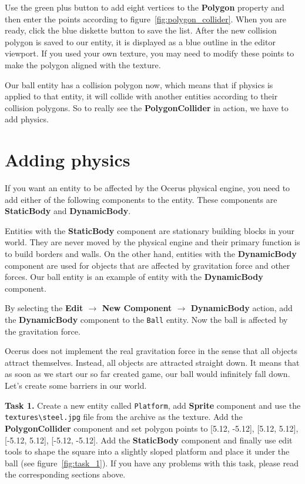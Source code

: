 \documentclass[a4paper,12pt]{article}
\begin{document}
Use the green plus button to add eight vertices to the \textbf{Polygon} property and then enter the points according to figure~\ref{fig:polygon_collider}. When you are ready, click the blue diskette button to save the list. After the new collision polygon is saved to our entity, it is displayed as a blue outline in the editor viewport. If you used your own texture, you may need to modify these points to make the polygon aligned with the texture.

Our ball entity has a collision polygon now, which means that if physics is applied to that entity, it will collide with another entities according to their collision polygons. So to really see the \textbf{PolygonCollider} in action, we have to add physics.

\section{Adding physics}
If you want an entity to be affected by the Ocerus physical engine, you need to add either of the following components to the entity. These components are \textbf{StaticBody} and \textbf{DynamicBody}.

Entities with the \textbf{StaticBody} component are stationary building blocks in your world. They are never moved by the physical engine and their primary function is to build borders and walls. On the other hand, entities with the \textbf{DynamicBody} component are used for objects that are affected by gravitation force and other forces. Our ball entity is an example of entity with the \textbf{DynamicBody} component.

By selecting the \textbf{Edit $\to$ New Component $\to$ DynamicBody} action, add the \textbf{DynamicBody} component to the \texttt{Ball} entity. Now the ball is affected by the gravitation force.

Ocerus does not implement the real gravitation force in the sense that all objects attract themselves. Instead, all objects are attracted straight down. It means that as soon as we start our so far created game, our ball would infinitely fall down. Let's create some barriers in our world.

\textbf{Task 1.} Create a new entity called \texttt{Platform}, add \textbf{Sprite} component and use the \texttt{textures\textbackslash steel.jpg} file from the archive as the texture. Add the \textbf{PolygonCollider} component and set polygon points to [5.12, -5.12], [5.12, 5.12], [-5.12, 5.12], [-5.12, -5.12]. Add the \textbf{StaticBody} component and finally use edit tools to shape the square into a slightly sloped platform and place it under the ball (see figure~\ref{fig:task_1}). If you have any problems with this task, please read the corresponding sections above.
\end{document}
